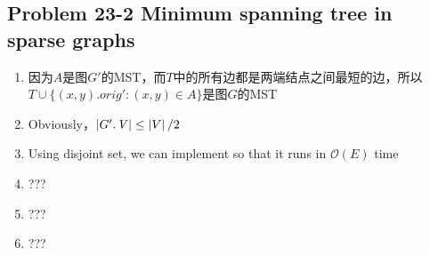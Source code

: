 \subsection*{Problem 23-2 Minimum spanning tree in sparse graphs}
\begin{enumerate}
	\item	因为$A$是图$G'$的MST，而$T$中的所有边都是两端结点之间最短的边，所以$T \cup \{(x, y).orig':(x, y) \in A\}$是图$G$的MST
	\item	Obviously，$\abs{\attrib{G'}{V}} \leq \abs{V} / 2$
	\item	Using disjoint set, we can implement  so that it runs in $\mathcal{O}(E)$ time
	\item	???
	\item	???
	\item	???
\end{enumerate}

